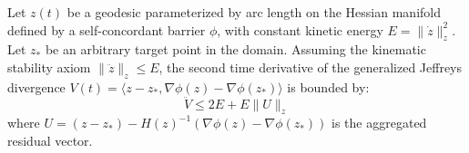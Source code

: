 \begin{theorem}
\label{thm:acceleration_bound}
Let $z(t)$ be a geodesic parameterized by arc length on the Hessian manifold defined by a self-concordant barrier $\phi$, with constant kinetic energy $E = \|\dot{z}\|_z^2$. Let $z_*$ be an arbitrary target point in the domain. Assuming the kinematic stability axiom $\|\ddot{z}\|_z \le E$, the second time derivative of the generalized Jeffreys divergence $V(t) = \langle z - z_*, \nabla \phi(z) - \nabla \phi(z_*) \rangle$ is bounded by:
\begin{equation}
    \ddot{V} \le 2E + E \|U\|_z
\end{equation}
where $U = (z - z_*) - H(z)^{-1}(\nabla \phi(z) - \nabla \phi(z_*))$ is the aggregated residual vector.
\end{theorem}

